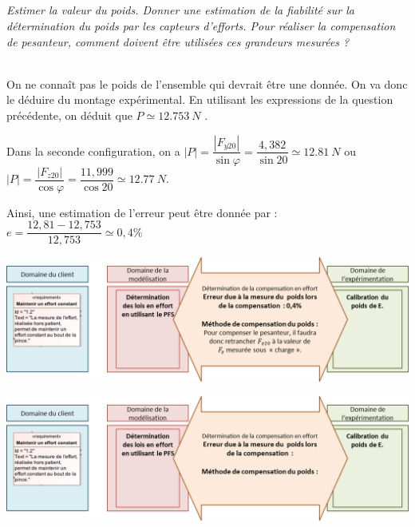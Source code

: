 \documentclass[10pt,fleqn]{article} %
\begin{document}
\begin{multicols}{2}
\fi
\subparagraph{}
\textit{Estimer la valeur du poids. Donner une estimation de la fiabilité sur la détermination du poids par les capteurs d'efforts. 
Pour réaliser la compensation de pesanteur, comment doivent être utilisées ces grandeurs mesurées ?}
\ifprof
\begin{corrige} ~\\
On ne connaît pas le poids de l'ensemble qui devrait être une donnée. On va donc le déduire du montage expérimental. En utilisant les expressions de la question précédente, on déduit que $P\simeq  \SI{12,753}{N}$ . 

Dans la seconde configuration, on a $|P|=\dfrac{|F_{y20}|}{\sin\varphi}=\dfrac{4,382}{\sin 20}\simeq \SI{12,81}{N}$ ou  $|P|=\dfrac{|F_{z20}|}{\cos\varphi}=\dfrac{11,999}{\cos 20}\simeq \SI{12,77}{N}$.

Ainsi, une estimation de l'erreur peut être donnée par : $e=\dfrac{12,81-12,753}{12,753}\simeq0,4\%$

\begin{center}
\includegraphics[width=\linewidth]{images/cor_03}
\end{center}

%


\end{corrige}
\else
\begin{center}
\includegraphics[width=\linewidth]{images/fig_08}
\end{center}


\end{multicols}
\end{document}
